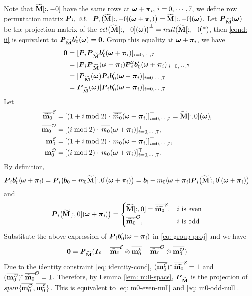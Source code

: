 Note that $\M[:,-0]$ have the same rows at $\V{\omega} + \V{\pi}_i,\,i = 0,\cdots,7$, we define row permutation matrix $\V{P}_i,\; s.t.\,$ $\V{P}_i\big(\M[:,-0](\V{\omega} + \V{\pi}_i)\big) = \M[:,-0](\V{\omega}). $ Let $\V{P}_{\M}(\V{\omega})$ be the projection matrix of the $col\big(\M[:,-0](\V{\omega})\big)^\bot = null(\M[:,-0]^*)$, then \ref{cond: ii} is equivalent to $\V{P}_{\M}\V{b}_0'(\V{\omega}) = \V{0}.$ Group this equality at $\V{\omega}+\V{\pi}_i$, we have 
\begin{align}\label{eq: group-proj}
\V{0} & = [\V{P}_i\V{P}_{\M}\V{b}_0'(\V{\omega} + \V{\pi}_i) ]_{i=0,\cdots,7}\notag\\
&= [\V{P}_i\V{P}_{\M}(\V{\omega}+\V{\pi}_i)\V{P}_i^2\V{b}_0'(\V{\omega}+\V{\pi}_i) ]_{i = 0,\cdots,7}\notag\\
&= [\V{P}_{\M}(\V{\omega})\V{P}_i\V{b}_0'(\V{\omega}+\V{\pi}_i)]_{i = 0,\cdots,7}\notag\\
&= \V{P}_{\M}(\V{\omega})[\V{P}_i\V{b}_0'(\V{\omega}+\V{\pi}_i)]_{i = 0,\cdots,7}
\end{align}
Let 
\begin{align*}
\mteven&= [ (1 + i \bmod 2)\cdot\,\sbarmp{0}{i}]_{i=0,\cdots,7}^\top = \M[:,0](\V{\omega}),\\
\mtodd&= [ (i \bmod 2)\cdot\,\sbarmp{0}{i}]_{i=0,\cdots,7}^\top,\\
\meven&= [ (1 + i \bmod 2)\cdot\,m_0(\V{\omega} + \V{\pi}_i)]_{i=0,\cdots,7}^\top,\\
\modd&= [ ( i \bmod 2)\cdot\,m_0(\V{\omega} + \V{\pi}_i)]_{i=0,\cdots,7}^\top.
\end{align*}
By definition, 
$$ \V{P}_i\V{b}_0'(\V{\omega}+\V{\pi}_i) = \V{P}_i\big(\V{b}_0 - m_0\M[:,0](\V{\omega}+\V{\pi}_i)\big)  = \V{b}_i - m_0(\V{\omega}+\V{\pi}_i)\V{P}_i\big(\M[:,0](\V{\omega}+\V{\pi}_i)\big)$$
and 
$$\V{P}_i\big(\M[:,0](\V{\omega}+\V{\pi}_i)\big) = 
\begin{cases}
   \M[:,0] = \mteven, &  i \text{ is even}\\[.2em]
    \mtodd,              & i \text{ is odd}
\end{cases}
$$
Substitute the above expression of $ \V{P}_i\V{b}_0'(\V{\omega}+\V{\pi}_i)$ in \eqref{eq: group-proj} and we have
\begin{align}
\V{0}  
= \V{P}_{\M}(\V{I}_8 -  \mteven\otimes\overline{\meven} - \mtodd\otimes\overline{\modd})
\end{align}
Due to the identity constraint \eqref{eq: identity-cond}, $(\overline{\meven})^*\,\mteven = 1$ and $(\overline{\modd})^*\,\mtodd = 1$. Therefore, by Lemma \ref{lem: null-space}, $\V{P}_{\M}$ is the projection of $span\{\overline{\modd},\overline{\meven}\}$. This is equivalent to \eqref{eq: m0-even-null} and \eqref{eq: m0-odd-null}.
